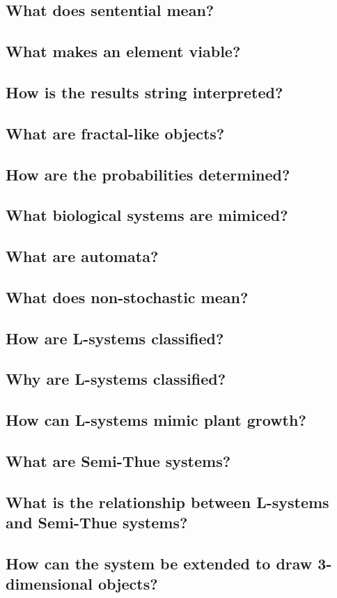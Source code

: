 \documentclass[11pt]{report}
\begin{document}
\subsection{What does sentential mean?}

\subsection{What makes an element viable?}

\subsection{How is the results string interpreted?}

\subsection{What are fractal-like objects?}

\subsection{How are the probabilities determined?}

\subsection{What biological systems are mimiced?}

\subsection{What are automata?}

\subsection{What does non-stochastic mean?}

\subsection{How are L-systems classified?}

\subsection{Why are L-systems classified?}

\subsection{How can L-systems mimic plant growth?}

\subsection{What are Semi-Thue systems?}

\subsection{What is the relationship between L-systems and Semi-Thue systems?}

\subsection{How can the system be extended to draw 3-dimensional objects?}

\clearpage
\printbibliography
\end{document}
